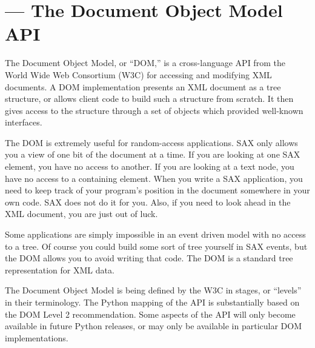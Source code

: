 \section{ ---
         The Document Object Model API}



The Document Object Model, or ``DOM,'' is a cross-language API from
the World Wide Web Consortium (W3C) for accessing and modifying XML
documents.  A DOM implementation presents an XML document as a tree
structure, or allows client code to build such a structure from
scratch.  It then gives access to the structure through a set of
objects which provided well-known interfaces.

The DOM is extremely useful for random-access applications.  SAX only
allows you a view of one bit of the document at a time.  If you are
looking at one SAX element, you have no access to another.  If you are
looking at a text node, you have no access to a containing element.
When you write a SAX application, you need to keep track of your
program's position in the document somewhere in your own code.  SAX
does not do it for you.  Also, if you need to look ahead in the XML
document, you are just out of luck.

Some applications are simply impossible in an event driven model with
no access to a tree.  Of course you could build some sort of tree
yourself in SAX events, but the DOM allows you to avoid writing that
code.  The DOM is a standard tree representation for XML data.


The Document Object Model is being defined by the W3C in stages, or
``levels'' in their terminology.  The Python mapping of the API is
substantially based on the DOM Level 2 recommendation.  Some aspects
of the API will only become available in future Python releases, or
may only be available in particular DOM implementations.

